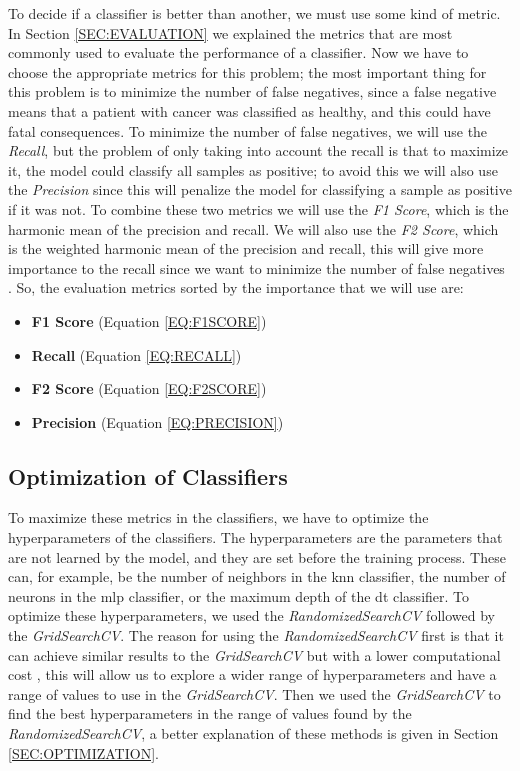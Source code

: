 To decide if a classifier is better than another, we must use some kind of metric. In Section \ref{SEC:EVALUATION} we explained the metrics that are most commonly used to evaluate the performance of a classifier. Now we have to choose the appropriate metrics for this problem; the most important thing for this problem is to minimize the number of false negatives, since a false negative means that a patient with cancer was classified as healthy, and this could have fatal consequences. To minimize the number of false negatives, we will use the \textit{Recall}, but the problem of only taking into account the recall is that to maximize it, the model could classify all samples as positive; to avoid this we will also use the \textit{Precision} since this will penalize the model for classifying a sample as positive if it was not. To combine these two metrics we will use the \textit{F1 Score}, which is the harmonic mean of the precision and recall. We will also use the \textit{F2 Score}, which is the weighted harmonic mean of the precision and recall, this will give more importance to the recall since we want to minimize the number of false negatives \cite{rutecki_best_nodate}. So, the evaluation metrics sorted by the importance that we will use are:

\begin{itemize}
    \item \textbf{F1 Score} (Equation \ref{EQ:F1SCORE})
    \item \textbf{Recall} (Equation \ref{EQ:RECALL})
    \item \textbf{F2 Score} (Equation \ref{EQ:F2SCORE})
    \item \textbf{Precision} (Equation \ref{EQ:PRECISION})
\end{itemize}

\subsection{Optimization of Classifiers}

To maximize these metrics in the classifiers, we have to optimize the hyperparameters of the classifiers. The hyperparameters are the parameters that are not learned by the model, and they are set before the training process. These can, for example, be the number of neighbors in the \ac{knn} classifier, the number of neurons in the \ac{mlp} classifier, or the maximum depth of the \ac{dt} classifier. To optimize these hyperparameters, we used the \textit{RandomizedSearchCV} followed by the \textit{GridSearchCV}. The reason for using the \textit{RandomizedSearchCV} first is that it can achieve similar results to the \textit{GridSearchCV} but with a lower computational cost \cite{bergstra_random_nodate}, this will allow us to explore a wider range of hyperparameters and have a range of values to use in the \textit{GridSearchCV}. Then we used the \textit{GridSearchCV} to find the best hyperparameters in the range of values found by the \textit{RandomizedSearchCV}, a better explanation of these methods is given in Section \ref{SEC:OPTIMIZATION}.

